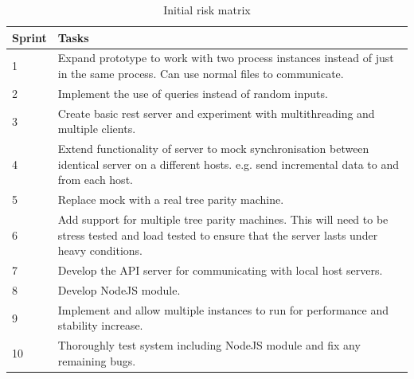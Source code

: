 \begin{table}[h]
\centering
\caption{Initial risk matrix}
\begin{tabular}{|p{1cm}|p{12cm}|}
\hline Sprint & Tasks \\ [14pt]

\hline 1 & Expand prototype to work with two process instances instead of just in the same process. Can use normal files to communicate. \\ [12pt]

\hline 2 & Implement the use of queries instead of random inputs. \\ [12pt]

\hline 3 & Create basic rest server and experiment with multithreading and multiple clients. \\ [12pt]

\hline 4 & Extend functionality of server to mock synchronisation between identical server on a different hosts. e.g. send incremental data to and from each host.\\ [12pt]

\hline 5 & Replace mock with a real tree parity machine. \\ [12pt]

\hline 6 & Add support for multiple tree parity machines. This will need to be stress tested and load tested to ensure that the server lasts under heavy conditions. \\ [12pt]

\hline 7 & Develop the API server for communicating with local host servers. \\ [12pt]

\hline 8 & Develop NodeJS module. \\ [12pt]

\hline 9 & Implement and allow multiple instances to run for performance and stability increase. \\ [12pt]

\hline 10 & Thoroughly test system including NodeJS module and fix any remaining bugs. \\ [12pt]

\hline
\end{tabular} \\
\label{tab:ProjRisks}
\end{table}

\FloatBarrier



